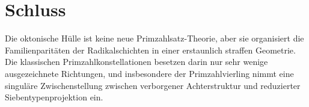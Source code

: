 \documentclass[11pt,a4paper]{article}
\theoremstyle{definition}
\theoremstyle{remark}
\begin{document}
	\section{Schluss}
	
	Die oktonische Hülle ist keine neue Primzahlsatz-Theorie, aber sie organisiert die
	Familienparitäten der Radikalschichten in einer erstaunlich straffen Geometrie.
	Die klassischen Primzahlkonstellationen besetzen darin nur sehr wenige ausgezeichnete
	Richtungen, und insbesondere der Primzahlvierling nimmt eine singuläre Zwischenstellung
	zwischen verborgener Achterstruktur und reduzierter Siebentypenprojektion ein.
	
\end{document}
